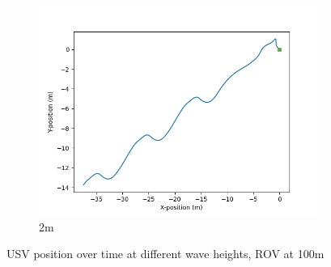 \documentclass[class=article, crop=false]{standalone}
\begin{document}
\begin{figure}
\begin{subfigure}[b]{0.48\textwidth}
        \includegraphics{scenario1/rov-100m/2.0m/usv_position_uncontrolled}
        \caption{2m}
        \label{}
    \end{subfigure}

    \caption{USV position over time at different wave heights, ROV at 100m}
\end{figure}
\end{document}
